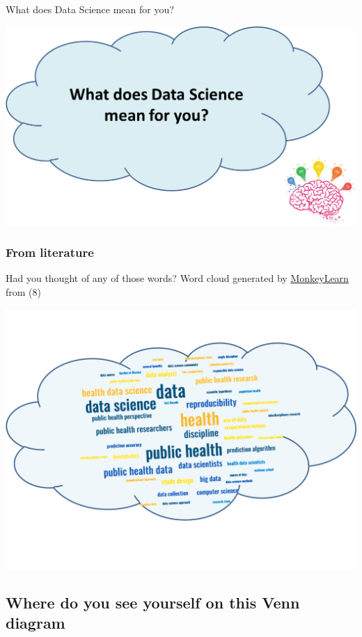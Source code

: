\documentclass[
  letterpaper,
  DIV=11,
  numbers=noendperiod,
  oneside]{scrreprt}
\begin{document}
What does Data Science mean for you?

\includegraphics{./images/paste-AC41DECB.png}

\hypertarget{from-literature}{%
\subsubsection{From literature}\label{from-literature}}

Had you thought of any of those words? Word cloud generated by
\href{https://monkeylearn.com/word-cloud/}{MonkeyLearn} from (8)

\includegraphics{./images/paste-FFA998D0.png}

\hypertarget{where-do-you-see-yourself-on-this-venn-diagram}{%
\subsection{Where do you see yourself on this Venn
diagram}\label{where-do-you-see-yourself-on-this-venn-diagram}}
\end{document}
